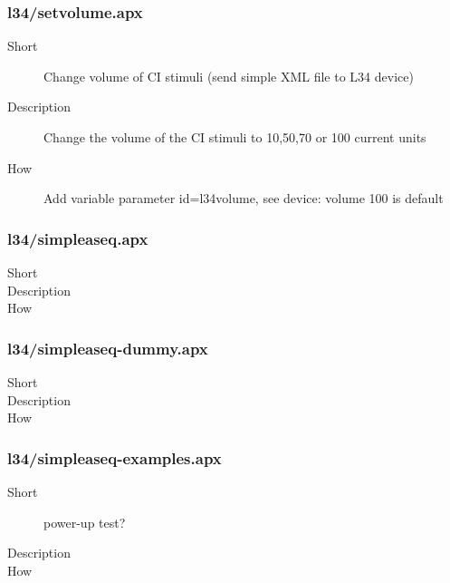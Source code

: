 \subsubsection{l34/setvolume.apx}
\begin{description}
\item[Short] 
 Change volume of CI stimuli (send simple XML file to L34 device)
\item[Description] 
 Change the volume of the CI stimuli to 10,50,70 or 100 current units
\item[How] 
 Add variable parameter id=l34volume, see device: volume 100 is default
\end{description}

\subsubsection{l34/simpleaseq.apx}
\begin{description}
\item[Short] 

\item[Description] 

\item[How] 

\end{description}

\subsubsection{l34/simpleaseq-dummy.apx}
\begin{description}
\item[Short] 

\item[Description] 

\item[How] 

\end{description}

\subsubsection{l34/simpleaseq-examples.apx}
\begin{description}
\item[Short] 
 power-up test?
\item[Description] 

\item[How] 

\end{description}

